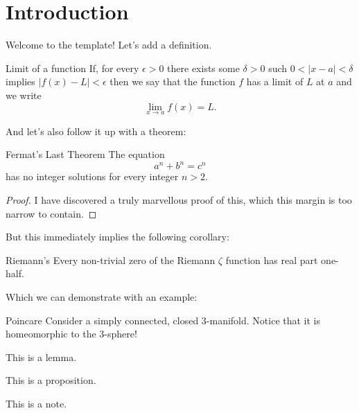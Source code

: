 
	\maketitle
	\section{Introduction}
	Welcome to the template! Let's add a definition.
	\begin{definition}{Limit of a function}{}
	If, for every $ \epsilon >0 $ there exists some $ \delta >0 $ such $ 0<|x-a|<\delta $ implies $ |f(x)-L|<\epsilon $ then we say that the function $ f $ has a limit of $ L $ at $ a $ and we write
	\[\lim_{x\to a}f(x)=L.\]
	\end{definition}%
	And let's also follow it up with a theorem:
	\begin{theorem}{Fermat's Last Theorem}{}
		The equation
		\[a^n+b^n=c^n\]
		has no integer solutions for every integer $ n> 2 $.
	\end{theorem}%
	\begin{proof}
		I have discovered a truly marvellous proof of this, which this margin is too narrow to contain.
	\end{proof}%
	But this immediately implies the following corollary:
	\begin{corollary}{Riemann's}{}
		Every non-trivial zero of the Riemann $ \zeta $ function has real part one-half.
	\end{corollary}%
	Which we can demonstrate with an example:
	\begin{example}{Poincare}{}
		Consider a simply connected, closed 3-manifold. Notice that it is homeomorphic to the 3-sphere!
	\end{example}%
	\begin{lemma}
		This is a lemma.
	\end{lemma}%
	\begin{proposition}
		This is a proposition.
	\end{proposition}%
	\begin{note}
		This is a note.
	\end{note}%
		
